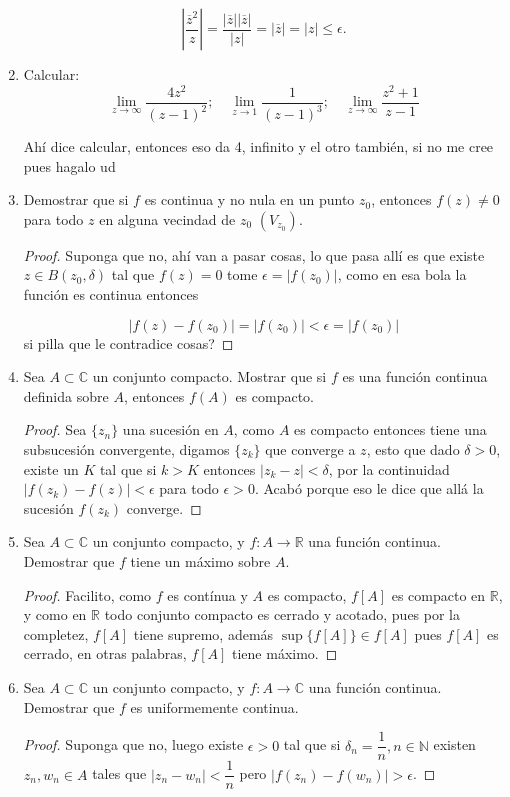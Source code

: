 \documentclass[11pt]{article}
\begin{document}
\begin{enumerate}
$$\left|\frac{\overline{z}^2}{z} \right|=\frac{|\overline{z}||\overline{z}|}{|z|}=|\overline{z}|=|z|\leq\epsilon.$$

    \item Calcular:
    \[
    \lim_{z \to \infty} \frac{4z^2}{(z - 1)^2}; \quad \lim_{z \to 1} \frac{1}{(z - 1)^3}; \quad \lim_{z \to \infty} \frac{z^2 + 1}{z - 1}
    \]

    Ahí dice calcular, entonces eso da 4, infinito y el otro también, si no me cree pues hagalo ud

    \item Demostrar que si $f$ es continua y no nula en un punto $z_0$, entonces $f(z) \neq 0$ para todo $z$ en alguna vecindad de $z_0$ $(V_{z_0})$.

\begin{proof}
Suponga que no, ahí van a pasar cosas, lo que pasa allí es que existe $z\in B(z_0,\delta)$ tal que $f(z)=0$ tome $\epsilon=|f(z_0)|$, como en esa bola la función es continua entonces

$$|f(z)-f(z_0)|=|f(z_0)|<\epsilon=|f(z_0)|$$
si pilla que le contradice cosas?
\end{proof}

    \item Sea $A \subset \mathbb{C}$ un conjunto compacto. Mostrar que si $f$ es una función continua definida sobre $A$, entonces $f(A)$ es compacto.

\begin{proof}
Sea $\{z_n\}$ una sucesión en $A$, como $A$ es compacto entonces tiene una subsucesión convergente, digamos $\{z_{k}\}$ que converge a $z$, esto que dado $\delta>0$, existe un $K$ tal que si $k>K$ entonces $|z_{k}-z|<\delta$, por la continuidad $|f(z_k)-f(z)|<\epsilon$ para todo $\epsilon>0$. Acabó porque eso le dice que allá la sucesión $f(z_k)$ converge.
\end{proof}

    \item Sea $A \subset \mathbb{C}$ un conjunto compacto, y $f: A \to \mathbb{R}$ una función continua. Demostrar que $f$ tiene un máximo sobre $A$.
    \begin{proof}
    Facilito, como $f$ es contínua y $A$ es compacto, $f[A]$ es compacto en $\mathbb{R}$, y como en $\mathbb{R}$ todo conjunto compacto es cerrado y acotado, pues por la completez, $f[A]$ tiene supremo, además $\sup\{f[A]\}\in f[A]$ pues $f[A]$ es cerrado, en otras palabras, $f[A]$ tiene máximo.
    \end{proof}
    \item Sea $A \subset \mathbb{C}$ un conjunto compacto, y $f: A \to \mathbb{C}$ una función continua. Demostrar que $f$ es uniformemente continua.
    \begin{proof}
    Suponga que no, luego existe $\epsilon>0$ tal que si $\delta_n=\dfrac{1}{n}, n\in\mathbb{N}$ existen $z_n,w_n\in A$ tales que $|z_n-w_n|<\dfrac{1}{n}$  pero $|f(z_n)-f(w_n)|>\epsilon$.


\end{proof}
\end{enumerate}
\end{document}
